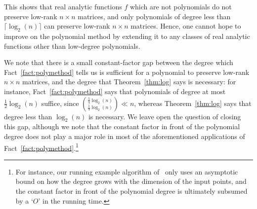 This shows that real analytic functions $f$ which are not polynomials do not preserve low-rank $n \times n$ matrices, and only polynomials of degree less than $\lceil \log_2(n) \rceil$ can preserve low-rank $n \times n$ matrices.
Hence, one cannot hope to improve on the polynomial method by extending it to any classes of real analytic functions other than low-degree polynomials. 

We note that there is a small constant-factor gap between the degree which Fact~\ref{fact:polymethod} tells us is sufficient for a polynomial to preserve low-rank $n \times n$ matrices, and the degree that Theorem~\ref{thm:log} says is necessary: for instance, Fact~\ref{fact:polymethod} says that polynomials of degree at most $\frac12 \log_2(n)$ suffice, since $\binom{\frac54 \log_2(n)}{\frac14 \log_2(n)} \ll n$, whereas Theorem~\ref{thm:log} says that degree less than $\log_2(n)$ is necessary. We leave open the question of closing this gap, although we note that the constant factor in front of the polynomial degree does not play a major role in most of the aforementioned applications of Fact~\ref{fact:polymethod}.\footnote{For instance, our running example algorithm of~\cite{acw16} only uses an asymptotic bound on how the degree grows with the dimension of the input points, and the constant factor in front of the polynomial degree is ultimately subsumed by a `$O$' in the running time.}
  
